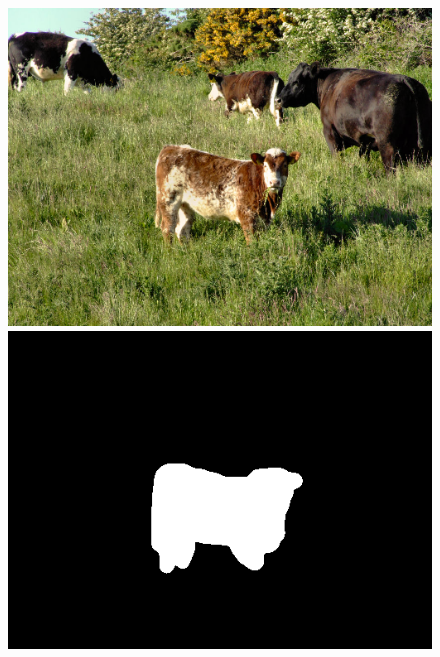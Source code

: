 \documentclass[a4paper, 10pt]{article}
\begin{document}
\begin{figure}[H]
\begin{minipage}{.4\textwidth}
\centering
\includegraphics[scale=0.25]{images/cow.png}
\end{minipage}%
\begin{minipage}{.4\textwidth}
\centering
\includegraphics[scale=0.25]{images/cow-mask.png}
\end{minipage}%
\begin{minipage}{.4\textwidth}
\centering

\end{minipage}
\end{figure}
\end{document}
